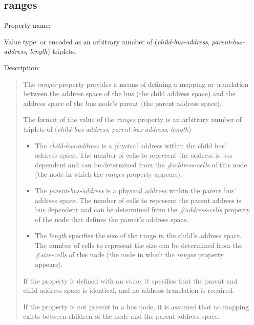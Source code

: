 \documentclass[a4paper,10pt,oneside]{sphinxmanual}
\begin{document}
\subsection{ranges}
\label{devicetree-basics:ranges}\label{devicetree-basics:sect-standard-properties-ranges}
Property name: 

Value type:  or  encoded as an arbitrary number of
(\emph{child-bus-address}, \emph{parent-bus-address}, \emph{length}) triplets.

Description:
\begin{quote}

The \emph{ranges} property provides a means of defining a mapping or
translation between the address space of the bus (the child address
space) and the address space of the bus node’s parent (the parent
address space).

The format of the value of the \emph{ranges} property is an arbitrary number
of triplets of (\emph{child-bus-address}, \emph{parent-bus-address}, \emph{length})
\begin{itemize}
\item {} 
The \emph{child-bus-address} is a physical address within the child bus'
address space. The number of cells to represent the address is bus
dependent and can be determined from the \emph{\#address-cells} of this node
(the node in which the \emph{ranges} property appears).

\item {} 
The \emph{parent-bus-address} is a physical address within the parent bus'
address space. The number of cells to represent the parent address is
bus dependent and can be determined from the \emph{\#address-cells} property
of the node that defines the parent’s address space.

\item {} 
The \emph{length} specifies the size of the range in the child’s address space. The number
of cells to represent the size can be determined from the \emph{\#size-cells}
of this node (the node in which the \emph{ranges} property appears).

\end{itemize}

If the property is defined with an  value, it specifies that the
parent and child address space is identical, and no address translation
is required.

If the property is not present in a bus node, it is assumed that no
mapping exists between children of the node and the parent address
space.
\end{quote}
\end{document}
